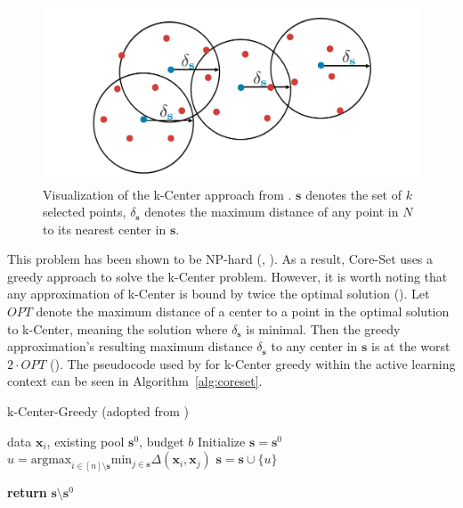 \documentclass[english,bachelor,ul]{webisthesis} %
\begin{document}
\begin{figure}[htbp]
    \centering
    \includegraphics[width=1\textwidth]{img/core-set.png}
    \caption{Visualization of the k-Center approach from \cite{DBLP:conf/iclr/SenerS18}. $ \mathbf{s} $ denotes the set of $ k $ selected points, $ \delta_{\mathbf{s}} $ denotes the maximum distance of any point in $ N $ to its nearest center in $ \mathbf{s} $.}
    \label{fig:coreset}
\end{figure}

This problem has been shown to be NP-hard (\cite{DBLP:journals/dam/HsuN79}, \cite{DBLP:journals/anor/Hochbaum84}). As a result, Core-Set uses a greedy approach to solve the k-Center problem. However, it is worth noting that any approximation of k-Center is bound by twice the optimal solution (\cite{DBLP:journals/dam/HsuN79}). Let $ OPT $ denote the maximum distance of a center to a point in the optimal solution to k-Center, meaning the solution where $\delta_{\mathbf{s}} $ is minimal. Then the greedy approximation's resulting maximum distance $ \delta_{\mathbf{s}} $ to any center in $ \mathbf{s} $ is at the worst $ 2 \cdot OPT $ (\cite{mountkcenter}). The pseudocode used by \cite{DBLP:conf/iclr/SenerS18} for k-Center greedy within the active learning context can be seen in Algorithm~\ref{alg:coreset}.

\begin{algorithm}[htpb]
    \caption{k-Center-Greedy (adopted from \cite{DBLP:conf/iclr/SenerS18})}%
\label{alg:coreset}
\begin{algorithmic}


\Require data $ \mathbf{x}_i $, existing pool $ \mathbf{s}^0 $, budget $ b $
\State Initialize $ \mathbf{s} = \mathbf{s}^0 $
\Repeat
\State $ u = \text{argmax}_{i \in [n] \setminus \mathbf{s}} \text{min}_{j \in \mathbf{s}} \Delta(\mathbf{x}_i, \mathbf{x}_j) $
\State $ \mathbf{s} = \mathbf{s} \cup \{u\} $

\State \textbf{return} $\mathbf{s} \setminus \mathbf{s}^0 $
\end{algorithmic}
\end{algorithm}
\end{document}

